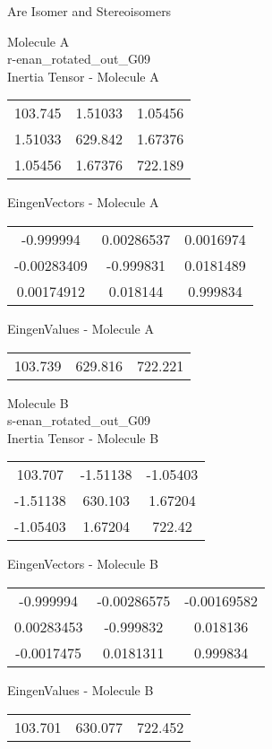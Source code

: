 \begin{center}
\vtab
\vtab
\textcolor{NavyBlue}{\Large Are Isomer and Stereoisomers}
\end{center}
\newpage
\begin{multicols}{2}
\begin{center}
Molecule A \\ 
r-enan\_rotated\_out\_G09
\\
Inertia Tensor - Molecule A \\
\vtab
\begin{tabular}{|c c c|}
103.745	 & 	1.51033	 & 	1.05456	 \\
1.51033	 & 	629.842	 & 	1.67376	 \\
1.05456	 & 	1.67376	 & 	722.189
\end{tabular}

\vtab
 EingenVectors - Molecule A     \\
\vtab
\begin{tabular}{|c c c|}
-0.999994	 & 	0.00286537	 & 	0.0016974	 \\
-0.00283409	 & 	-0.999831	 & 	0.0181489	 \\
0.00174912	 & 	0.018144	 & 	0.999834
\end{tabular}

\vtab
 EingenValues - Molecule A     \\
\vtab
\begin{tabular}{|c c c|}
103.739	 & 	629.816	 & 	722.221
\end{tabular}
\columnbreak

Molecule B \\ 
s-enan\_rotated\_out\_G09
\\
Inertia Tensor - Molecule B \\
\vtab
\begin{tabular}{|c c c|}
103.707	 & 	-1.51138	 & 	-1.05403	 \\
-1.51138	 & 	630.103	 & 	1.67204	 \\
-1.05403	 & 	1.67204	 & 	722.42
\end{tabular}

\vtab
 EingenVectors - Molecule B     \\
\vtab
\begin{tabular}{|c c c|}
-0.999994	 & 	-0.00286575	 & 	-0.00169582	 \\
0.00283453	 & 	-0.999832	 & 	0.018136	 \\
-0.0017475	 & 	0.0181311	 & 	0.999834
\end{tabular}

\vtab
 EingenValues - Molecule B     \\
\vtab
\begin{tabular}{|c c c|}
103.701	 & 	630.077	 & 	722.452
\end{tabular}

\end{center}
\end{multicols}
